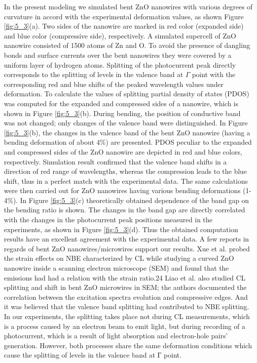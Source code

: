 In the present modeling we simulated bent ZnO nanowires with various degrees of curvature in accord with the experimental deformation values, as shown Figure \ref{fig:5_3}(a). Two sides of the nanowire are marked in red color (expanded side) and blue color (compressive side), respectively. A simulated supercell of ZnO nanowire consisted of 1500 atoms of Zn and O. To avoid the presence of dangling bonds and surface currents over the bent nanowires they were covered by a uniform layer of hydrogen atoms. 
Splitting of the photocurrent peak directly corresponds to the splitting of levels in the valence band at $\Gamma$ point with the corresponding red and blue shifts of the peaked wavelength values under deformation.\cite{D.-P.2012} To calculate the values of splitting partial density of states (PDOS) was computed for the expanded and compressed sides of a nanowire, which is shown in Figure \ref{fig:5_3}(b). During bending, the position of conductive band was not changed; only changes of the valence band were distinguished. In Figure \ref{fig:5_3}(b), the changes in the valence band of the bent ZnO nanowire (having a bending deformation of about 4\%) are presented. PDOS peculiar to the expanded and compressed sides of the ZnO nanowire are depicted in red and blue colors, respectively. Simulation result confirmed that the valence band shifts in a direction of red range of wavelengths, whereas the compression leads to the blue shift, thus in a perfect match with the experimental data. The same calculations were then carried out for ZnO nanowires having various bending deformations (1-4\%). In Figure \ref{fig:5_3}(c) theoretically obtained dependence of the band gap on the bending ratio is shown. The changes in the band gap are directly correlated with the changes in the photocurrent peak positions measured in the experiments, as shown in Figure \ref{fig:5_3}(d). Thus the obtained computation results have an excellent agreement with the experimental data. 
A few reports in regards of bent ZnO nanowires/microwires support our results. Xue et al. probed the strain effects on NBE characterized by CL while studying a curved ZnO nanowire inside a scanning electron microscope (SEM) and found that the emissions had had a relation with the strain ratio.24 Liao et al. also studied CL splitting and shift in bent ZnO microwires in SEM; the authors documented the correlation between the excitation spectra evolution and compressive edges. And it was believed that the valence band splitting had contributed to NBE splitting.\cite{T.2009} In our experiments, the splitting takes place not during CL measurements, which is a process caused by an electron beam to emit light, but during recording of a photocurrent, which is a result of light absorption and electron-hole pairs’ generation. However, both processes share the same deformation conditions which cause the splitting of levels in the valence band at Г point. 


